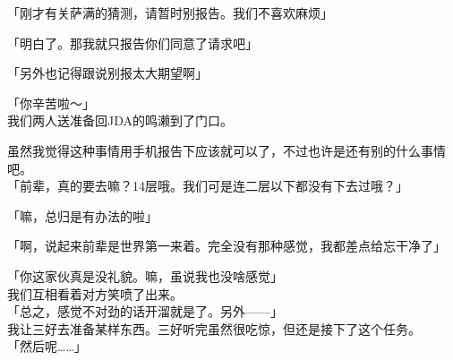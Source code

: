 「刚才有关萨满的猜测，请暂时别报告。我们不喜欢麻烦」

「明白了。那我就只报告你们同意了请求吧」

「另外也记得跟说别报太大期望啊」

「你辛苦啦～」\\

我们两人送准备回JDA的鸣濑到了门口。

虽然我觉得这种事情用手机报告下应该就可以了，不过也许是还有别的什么事情吧。\\

「前辈，真的要去嘛？14层哦。我们可是连二层以下都没有下去过哦？」

「嘛，总归是有办法的啦」

「啊，说起来前辈是世界第一来着。完全没有那种感觉，我都差点给忘干净了」

「你这家伙真是没礼貌。嘛，虽说我也没啥感觉」\\

我们互相看着对方笑喷了出来。\\

「总之，感觉不对劲的话开溜就是了。另外——」\\

我让三好去准备某样东西。三好听完虽然很吃惊，但还是接下了这个任务。\\

「然后呢……」\\

